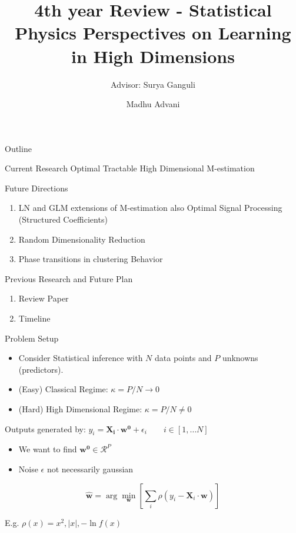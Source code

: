 \documentclass[pdf]{beamer}
\title[Physics of Learning]{4th year Review - Statistical Physics Perspectives on Learning in High Dimensions}
\subtitle{Advisor: Surya Ganguli}
\author{Madhu Advani}
\institute{Stanford University}
\newcommand{\ra}{\rightarrow}
\begin{document}
\begin{frame}
    \titlepage
\end{frame}

\begin{frame}{Outline}
\begin{block}{Current Research}
Optimal Tractable High Dimensional M-estimation
\end{block}
\vspace{.1in}
\begin{block}{Future Directions}
    \begin{enumerate}
        \item LN and GLM extensions of M-estimation also Optimal Signal Processing (Structured Coefficients)
        \item Random Dimensionality Reduction
        \item Phase transitions in clustering Behavior
    \end{enumerate}
\end{block}
\vspace{.1in}
\begin{block}{Previous Research and Future Plan}
    \begin{enumerate}
        \item Review Paper
        \item Timeline
    \end{enumerate}
\end{block}
\end{frame}


\begin{frame}{Problem Setup}
\begin{itemize}
\item Consider Statistical inference with $N$ data points and $P$ unknowns (predictors).
\item (Easy) Classical Regime: $\kappa = P/N\ra 0$
\item (Hard) High Dimensional Regime: $\kappa = P/N \ne 0$

\end{itemize}
\vspace{.2in}


Outputs generated by:
$y_i = \mathbf{X_i}\cdot \mathbf{w^0} + \epsilon_i \quad \quad i\in [1,\dots N]$

\vspace{.2in}
\begin{itemize}
\item We want to find $\mathbf{w^0}\in \mathcal{R}^P$
\item Noise $\epsilon$ not necessarily gaussian

\end{itemize}


\begin{equation*}
\mathbf{\hat{w}}=\arg \min_{\mathbf{w}}{\left[ \sum_{i} {\rho\left( y_i - \mathbf{X}_{i} \cdot \mathbf{w}\right)}\right]}
\end{equation*}

E.g. $\rho(x) = x^2,|x|,-\ln f(x)$

\end{frame}
\end{document}
